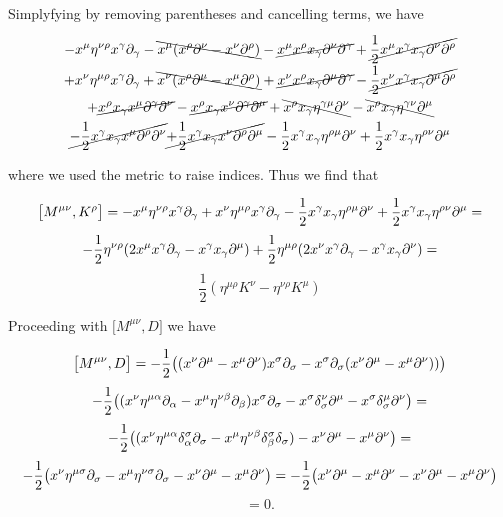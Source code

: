 Simplyfying by removing parentheses and cancelling terms, we have

\begin{gather*}
    -x^\mu \eta^{\nu \rho}x^\gamma \partial_\gamma
    -\bcancel{x^\mu (
        x^\rho \partial^\nu
        -x^\nu\partial^\rho)}
    -\cancel{x^\mu x^\rho x_\gamma \partial^\nu \partial^\gamma}
    +\cancel{\frac{1}{2} x^\mu x^\gamma x_\gamma \partial^\nu \partial^\rho}
    \\
    +x^\nu \eta^{\mu \rho}x^\gamma \partial_\gamma
    +\bcancel{ x^\nu (
        x^\rho \partial^\mu
        -x^\mu\partial^\rho)}
    +\cancel{x^\nu x^\rho x_\gamma \partial^\mu \partial^\gamma}
    -\cancel{\frac{1}{2} x^\nu x^\gamma x_\gamma \partial^\mu \partial^\rho}
        \\
    +\cancel{ x^\rho x_\gamma x^\mu \partial ^\gamma \partial^\nu }
    -\cancel{ x^\rho x_\gamma x^\nu \partial ^\gamma \partial^\mu }
    +\bcancel{ x^\rho x_\gamma \eta^{\gamma \mu} \partial^\nu}
    -\bcancel{ x^\rho x_\gamma \eta^{\gamma \nu} \partial^\mu}
    \\
    \cancel{-\frac{1}{2}x^\gamma x_\gamma x^\mu \partial ^\rho \partial^\nu }
    \cancel{+\frac{1}{2}x^\gamma x_\gamma x^\nu \partial ^\rho \partial^\mu }
    -\frac{1}{2}x^\gamma x_\gamma \eta^{\rho \mu} \partial^\nu
    +\frac{1}{2}x^\gamma x_\gamma \eta^{\rho \nu} \partial^\mu
\end{gather*}

where we used the metric to raise indices. Thus we find that

$$
\big[M^{\mu \nu}, K^\rho\big]=
    -x^\mu \eta^{\nu \rho}x^\gamma \partial_\gamma
    +x^\nu \eta^{\mu \rho}x^\gamma \partial_\gamma
    -\frac{1}{2}x^\gamma x_\gamma \eta^{\rho \mu} \partial^\nu
    +\frac{1}{2}x^\gamma x_\gamma \eta^{\rho \nu} \partial^\mu=
$$$$
- \frac{1}{2} \eta^{\nu \rho}(2x^\mu x^\gamma \partial_\gamma - x^\gamma x_\gamma \partial^\mu)+\frac{1}{2}\eta^{\mu \rho}(2x^\nu x^\gamma \partial_\gamma - x^\gamma x_\gamma \partial^\nu)=
$$$$
\frac{1}{2}( \eta^{\mu \rho}K^\nu-\eta^{\nu\rho} K^\mu )
$$


Proceeding with $\big[M^{\mu \nu}, D \big]$ we have

    $$
    \big[M^{\mu \nu}, D\big]=-\frac{1}{2}\big(
    (x^\nu \partial^\mu-x^\mu \partial^\nu)x^\sigma \partial_\sigma-
    x^\sigma \partial_\sigma(x^\nu \partial^\mu-x^\mu \partial^\nu))\big)
    $$$$
    - \frac{1}{2}\big( (x^\nu \eta^{\mu \alpha} \partial_\alpha-x^\mu \eta^{\nu \beta} \partial_\beta)x^\sigma \partial_\sigma-x^\sigma \delta^\nu _\sigma \partial^\mu - x^\sigma \delta^\mu_{\sigma} \partial^\nu \big)=
    $$$$
    -\frac{1}{2}\big( (x^\nu \eta^{\mu \alpha} \delta^\sigma_\alpha \partial_\sigma-
    x^\mu \eta^{\nu \beta} \delta^\sigma_\beta \delta_\sigma)- x^\nu\partial^\mu-x^\mu \partial^\nu \big)=
    $$$$
    -\frac{1}{2} \big( x^\nu \eta^{\mu \sigma}\partial_\sigma- x^\mu \eta^{\nu \sigma}\partial_\sigma-x^\nu\partial^\mu-x^\mu \partial^\nu\big)=
-\frac{1}{2}\big( x^\nu\partial^\mu-x^\mu \partial^\nu -x^\nu\partial^\mu-x^\mu \partial^\nu \big)
    $$$$
    =0.
    $$
    
